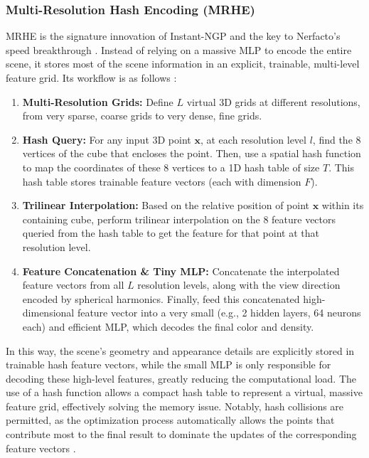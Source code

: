 \documentclass[11pt]{article}
\begin{document}
\subsubsection{Multi-Resolution Hash Encoding (MRHE)}
MRHE is the signature innovation of Instant-NGP and the key to Nerfacto's speed breakthrough \cite{nerfstudio_ingp}. Instead of relying on a massive MLP to encode the entire scene, it stores most of the scene information in an explicit, trainable, multi-level feature grid. Its workflow is as follows \cite{muller2022instant_pdf}:
\begin{enumerate}
    \item \textbf{Multi-Resolution Grids:} Define $L$ virtual 3D grids at different resolutions, from very sparse, coarse grids to very dense, fine grids.
    \item \textbf{Hash Query:} For any input 3D point $\mathbf{x}$, at each resolution level $l$, find the 8 vertices of the cube that encloses the point. Then, use a spatial hash function to map the coordinates of these 8 vertices to a 1D hash table of size $T$. This hash table stores trainable feature vectors (each with dimension $F$).
    \item \textbf{Trilinear Interpolation:} Based on the relative position of point $\mathbf{x}$ within its containing cube, perform trilinear interpolation on the 8 feature vectors queried from the hash table to get the feature for that point at that resolution level.
    \item \textbf{Feature Concatenation \& Tiny MLP:} Concatenate the interpolated feature vectors from all $L$ resolution levels, along with the view direction encoded by spherical harmonics. Finally, feed this concatenated high-dimensional feature vector into a very small (e.g., 2 hidden layers, 64 neurons each) and efficient MLP, which decodes the final color and density.
\end{enumerate}
In this way, the scene's geometry and appearance details are explicitly stored in trainable hash feature vectors, while the small MLP is only responsible for decoding these high-level features, greatly reducing the computational load. The use of a hash function allows a compact hash table to represent a virtual, massive feature grid, effectively solving the memory issue. Notably, hash collisions are permitted, as the optimization process automatically allows the points that contribute most to the final result to dominate the updates of the corresponding feature vectors \cite{nerfstudio_ingp}.
\end{document}
